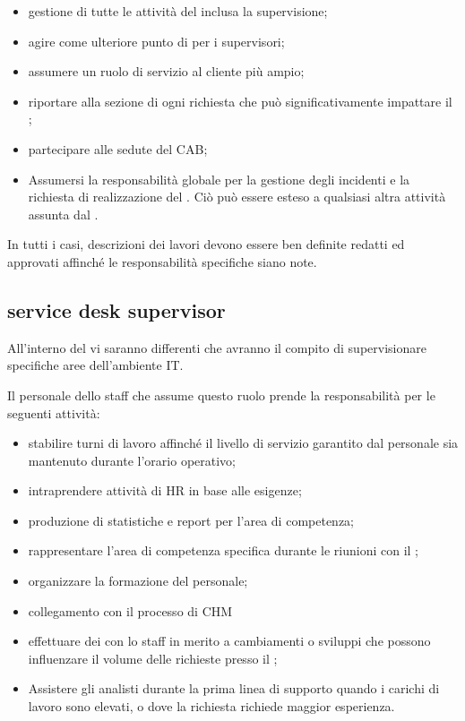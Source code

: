 \begin{itemize}
\item{gestione di tutte le attività del  inclusa la supervisione;}
\item{agire come ulteriore punto di  per i supervisori;}
\item{assumere un ruolo di servizio al cliente più ampio;}
\item{riportare alla sezione di  ogni richiesta che può significativamente impattare il ;}
\item{partecipare alle sedute del \ac{CAB};}
\item{Assumersi la responsabilità globale per la gestione degli incidenti e la richiesta di realizzazione del . Ciò può essere esteso a qualsiasi altra attività assunta dal .}
\end{itemize}

In tutti i casi, descrizioni dei lavori devono essere ben definite redatti ed approvati affinché le responsabilità specifiche siano note.

\subsection[Service Desk Supervisor]{service desk supervisor}
\label{sd-sd-supervisor}
All'interno del  vi saranno differenti  che avranno il compito di supervisionare specifiche aree dell'ambiente \acs{IT}.

Il personale dello staff che assume questo ruolo prende la responsabilità per le seguenti attività:

\begin{itemize}
\item{stabilire turni di lavoro affinché il livello di servizio garantito dal personale sia mantenuto durante l'orario operativo;}
\item{intraprendere attività di \ac{HR} in base alle esigenze;}
\item{produzione di statistiche e report per l'area di competenza;}
\item{rappresentare l'area di competenza specifica durante le riunioni con il ;}
\item{organizzare la formazione del personale;}
\item{collegamento con il processo di \ac{CHM}}
\item{effettuare dei  con lo staff in merito a cambiamenti o sviluppi che possono influenzare il volume delle richieste presso il ;}
\item{Assistere gli analisti durante la prima linea di supporto quando i carichi di lavoro sono elevati, o dove la richiesta richiede maggior esperienza.}
\end{itemize}

